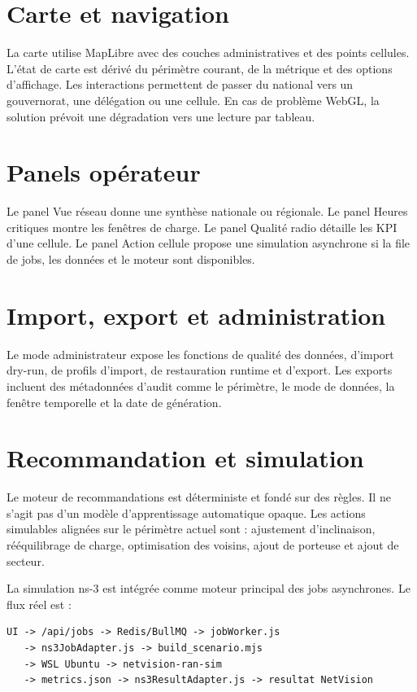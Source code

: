 \documentclass[12pt,a4paper,oneside]{report}
\begin{document}
\section{Carte et navigation}
La carte utilise MapLibre avec des couches administratives et des points cellules. L'état de carte est dérivé du périmètre courant, de la métrique et des options d'affichage. Les interactions permettent de passer du national vers un gouvernorat, une délégation ou une cellule. En cas de problème WebGL, la solution prévoit une dégradation vers une lecture par tableau.

\section{Panels opérateur}
Le panel Vue réseau donne une synthèse nationale ou régionale. Le panel Heures critiques montre les fenêtres de charge. Le panel Qualité radio détaille les KPI d'une cellule. Le panel Action cellule propose une simulation asynchrone si la file de jobs, les données et le moteur sont disponibles.

\section{Import, export et administration}
Le mode administrateur expose les fonctions de qualité des données, d'import dry-run, de profils d'import, de restauration runtime et d'export. Les exports incluent des métadonnées d'audit comme le périmètre, le mode de données, la fenêtre temporelle et la date de génération.

\section{Recommandation et simulation}
Le moteur de recommandations est déterministe et fondé sur des règles. Il ne s'agit pas d'un modèle d'apprentissage automatique opaque. Les actions simulables alignées sur le périmètre actuel sont : ajustement d'inclinaison, rééquilibrage de charge, optimisation des voisins, ajout de porteuse et ajout de secteur.

La simulation ns-3 est intégrée comme moteur principal des jobs asynchrones. Le flux réel est :
\begin{lstlisting}
UI -> /api/jobs -> Redis/BullMQ -> jobWorker.js
   -> ns3JobAdapter.js -> build_scenario.mjs
   -> WSL Ubuntu -> netvision-ran-sim
   -> metrics.json -> ns3ResultAdapter.js -> resultat NetVision
\end{lstlisting}
\end{document}
